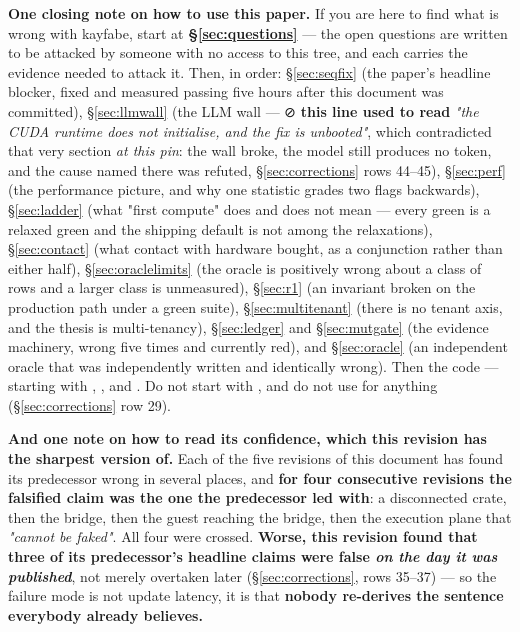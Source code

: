 \documentclass[10.5pt]{article}
\begin{document}
\vfill
\begin{claimbox}\small
\textbf{One closing note on how to use this paper.} If you are here to find what is wrong with
kayfabe, start at \textbf{\S\ref{sec:questions}} — the open questions are written to be attacked
by someone with no access to this tree, and each carries the evidence needed to attack it. Then,
in order: \S\ref{sec:seqfix} (the paper's headline blocker, fixed and measured passing five hours
after this document was committed), \S\ref{sec:llmwall} (the LLM wall --- ⊘ \textbf{this line
used to read} \emph{"the CUDA runtime does not initialise, and the fix is unbooted"}, which
contradicted that very section \emph{at this pin}: the wall broke, the model still produces no
token, and the cause named there was refuted, \S\ref{sec:corrections} rows 44--45),
\S\ref{sec:perf} (the performance picture, and why one statistic grades two flags backwards),
\S\ref{sec:ladder} (what "first compute" does and does not mean — every green is a relaxed green
and the shipping default is not among the relaxations), \S\ref{sec:contact} (what contact with
hardware bought, as a conjunction rather than either half), \S\ref{sec:oraclelimits} (the oracle
is positively wrong about a class of rows and a larger class is unmeasured), \S\ref{sec:r1} (an
invariant broken on the production path under a green suite), \S\ref{sec:multitenant} (there is
no tenant axis, and the thesis is multi-tenancy), \S\ref{sec:ledger} and \S\ref{sec:mutgate} (the
evidence machinery, wrong five times and currently red), and \S\ref{sec:oracle} (an independent
oracle that was independently written and identically wrong). Then the code — starting with
, ,  and
. Do not start with , and do not use
 for anything (\S\ref{sec:corrections} row 29).

\smallskip
\textbf{And one note on how to read its confidence, which this revision has the sharpest version
of.} Each of the five revisions of this document has found its predecessor wrong in several
places, and \textbf{for four consecutive revisions the falsified claim was the one the predecessor
led with}: a disconnected crate, then the bridge, then the guest reaching the bridge, then the
execution plane that \emph{"cannot be faked"}. All four were crossed. \textbf{Worse, this
revision found that three of its predecessor's headline claims were false \emph{on the day it was
published}}, not merely overtaken later (\S\ref{sec:corrections}, rows 35--37) — so the failure
mode is not update latency, it is that \textbf{nobody re-derives the sentence everybody already
believes.}


\end{claimbox}
\end{document}
